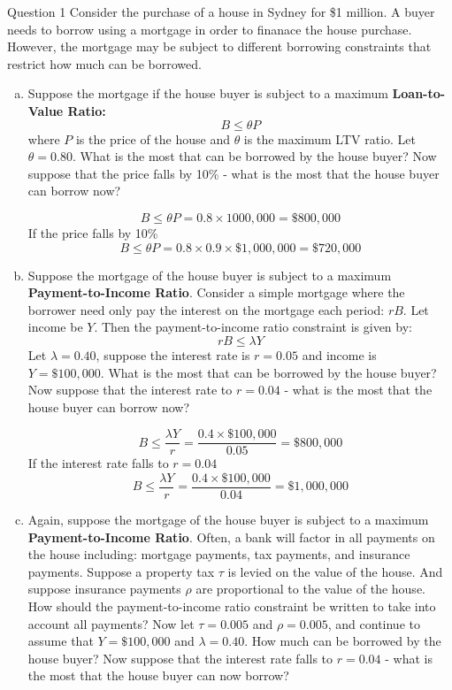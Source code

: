 \documentclass[a4paper]{article}
\begin{document}
	\begin{questionbox}{Question 1}
		Consider the purchase of a house in Sydney for \$1 million. A buyer needs to borrow using a mortgage in order to finanace the house purchase. However, the mortgage may be subject to different borrowing constraints that restrict how much can be borrowed.
		\begin{enumerate}[(a)]
			\item Suppose the mortgage if the house buyer is subject to a maximum \textbf{Loan-to-Value Ratio:}
			\[
				B \leq \theta P
			\]
			where \( P \) is the price of the house and \( \theta \) is the maximum LTV ratio. Let \( \theta = 0.80 \). What is the most that can be borrowed by the house buyer? Now suppose that the price falls by 10\% - what is the most that the house buyer can borrow now?
			\begin{explanationbox}
				\[
					B \leq \theta P = 0.8 \times 1 000,000 = \$800,000
				\]
				If the price falls by 10\%
				\[
					B \leq \theta P = 0.8 \times 0.9 \times \$1,000,000 = \$720,000
				\]
			\end{explanationbox}
			\item  Suppose the mortgage of the house buyer is subject to a maximum \textbf{Payment-to-Income Ratio}. Consider a simple mortgage where the borrower need only pay the interest on the mortgage each period: \( rB \). Let income be \( Y \). Then the payment-to-income ratio constraint is given by:
			\[
				rB \leq \lambda Y
			\]
			Let \( \lambda = 0.40 \), suppose the interest rate is \( r = 0.05 \) and income is \( Y=\$100,000 \). What is the most that can be borrowed by the house buyer? Now suppose that the interest rate to \( r = 0.04 \) - what is the most that the house buyer can borrow now?
			\begin{explanationbox}
				\[
					B \leq \frac{\lambda Y}{r} = \frac{0.4 \times \$100,000}{0.05} = \$800,000
				\]
				If the interest rate falls to \( r = 0.04 \)
				\[
					B \leq \frac{\lambda Y}{r} = \frac{0.4 \times \$100,000}{0.04} = \$1,000,000
				\]
			\end{explanationbox}
			\item Again, suppose the mortgage of the house buyer is subject to a maximum \textbf{Payment-to-Income Ratio}. Often, a bank will factor in all payments on the house including: mortgage payments, tax payments, and insurance payments. Suppose a property tax \( \tau \) is levied on the value of the house. And suppose insurance payments \( \rho \) are proportional to the value of the house. How should the payment-to-income ratio constraint be written to take into account all payments? Now let \( \tau = 0.005 \) and \( \rho = 0.005 \), and continue to assume that \( Y = \$100,000 \) and \( \lambda = 0.40 \). How much can be borrowed by the house buyer? Now suppose that the interest rate falls to \( r = 0.04 \) - what is the most that the house buyer can now borrow?

\end{enumerate}
\end{questionbox}
\end{document}
